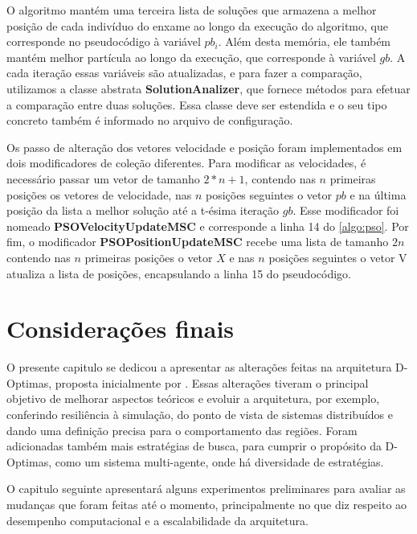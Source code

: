 O algoritmo mantém uma terceira lista de soluções que armazena a melhor posição de cada indivíduo do enxame ao longo da execução do algoritmo, que corresponde no pseudocódigo à variável $pb_i$. Além desta memória, ele também mantém melhor partícula ao longo da execução, que corresponde à variável $gb$. A cada iteração essas variáveis são atualizadas, e para fazer a comparação, utilizamos a classe abstrata  \textbf{SolutionAnalizer}, que fornece métodos para efetuar a comparação entre duas soluções. Essa classe deve ser estendida e o seu tipo concreto também é informado no arquivo de configuração. 

Os passo de alteração dos vetores velocidade e posição foram implementados em dois modificadores de coleção diferentes. Para modificar as velocidades, é necessário passar um vetor de tamanho $2*n + 1$, contendo nas $n$ primeiras posições os vetores de velocidade, nas $n$ posições seguintes o vetor $pb$ e na última posição da lista a melhor solução até a t-ésima iteração $gb$. Esse modificador foi nomeado \textbf{PSOVelocityUpdateMSC} e corresponde a linha 14 do \autoref{algo:pso}. Por fim, o modificador \textbf{PSOPositionUpdateMSC} recebe uma lista de tamanho $2n$ contendo nas $n$ primeiras posições o vetor $X$ e nas $n$ posições seguintes o vetor V  atualiza a lista de posições, encapsulando a linha 15 do pseudocódigo.

\section{Considerações finais}
O presente capitulo se dedicou a apresentar as alterações feitas na arquitetura D-Optimas, proposta inicialmente por . Essas alterações tiveram o principal objetivo de melhorar aspectos teóricos e evoluir a arquitetura, por exemplo, conferindo resiliência à simulação, do ponto de vista de sistemas distribuídos e dando uma definição precisa para o comportamento das regiões. Foram adicionadas também mais estratégias de busca, para cumprir o propósito da D-Optimas, como um sistema multi-agente, onde há diversidade de estratégias.

O capitulo seguinte apresentará alguns experimentos preliminares para avaliar as mudanças que foram feitas até o momento, principalmente no que diz respeito ao desempenho computacional e a escalabilidade da arquitetura.
